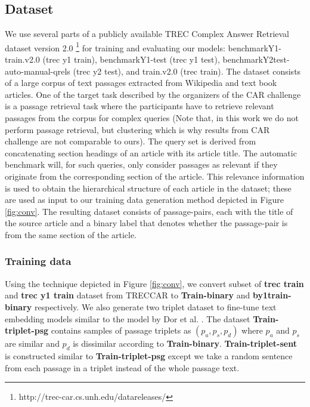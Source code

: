 \subsection{Dataset} 
We use several parts of a publicly available TREC Complex Answer Retrieval dataset version 2.0 \cite{dietz2017trec}\footnote{http://trec-car.cs.unh.edu/datareleases/} for training and evaluating our models: benchmarkY1-train.v2.0 (trec y1 train), benchmarkY1-test (trec y1 test), benchmarkY2test-auto-manual-qrels (trec y2 test), and train.v2.0 (trec train). The dataset consists of a large corpus of text passages extracted from Wikipedia and text book articles. One of the target task described by the organizers of the CAR challenge  is a passage retrieval task where the participants have to retrieve relevant passages from the corpus for complex queries (Note that, in this work we do not perform passage retrieval, but clustering which is why results from CAR challenge are not comparable to ours). The query set is derived from concatenating section headings of an article with its article title. The automatic benchmark will, for such queries, only consider passages as relevant if they originate from the corresponding section of the article. This relevance information is used to obtain the hierarchical structure of each article in the dataset; these are used as input to our training data generation method depicted in Figure \ref{fig:conv}. The resulting dataset consists of passage-pairs, each with the title of the source article and a binary label that denotes whether the passage-pair is from the same section of the article.


\subsubsection{Training data} Using the technique depicted in Figure \ref{fig:conv}, we convert subset of \textbf{trec train} and \textbf{trec y1 train} dataset from TRECCAR to \textbf{Train-binary} and \textbf{by1train-binary} respectively. We also generate two triplet dataset to fine-tune text embedding models similar to the model by Dor et al. . The dataset \textbf{Train-triplet-psg} contains samples of passage triplets as $(p_a, p_s, p_d)$ where $p_a$ and $p_s$ are similar and $p_d$ is dissimilar according to \textbf{Train-binary}. \textbf{Train-triplet-sent} is constructed similar to \textbf{Train-triplet-psg} except we take a random sentence from each passage in a triplet instead of the whole passage text.

